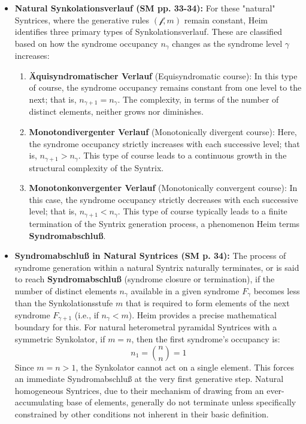 \documentclass[12pt]{article}
\newcommand{\synkolator}{\mathcal{f}}
\newcommand{\synkolationsstufe}{m}
\newcommand{\syndrom}{F} %
\begin{document}
\begin{itemize}
    \item \textbf{Natural Synkolationsverlauf (SM pp. 33-34):}
    For these "natural" Syntrices, where the generative rules \( (\synkolator, \synkolationsstufe) \) remain constant, Heim identifies three primary types of Synkolationsverlauf. These are classified based on how the syndrome occupancy \( n_\gamma \) changes as the syndrome level \( \gamma \) increases:
    \begin{enumerate}
        \item \textbf{Äquisyndromatischer Verlauf} (Equisyndromatic course): In this type of course, the syndrome occupancy remains constant from one level to the next; that is, \( n_{\gamma+1} = n_\gamma \). The complexity, in terms of the number of distinct elements, neither grows nor diminishes.
        \item \textbf{Monotondivergenter Verlauf} (Monotonically divergent course): Here, the syndrome occupancy strictly increases with each successive level; that is, \( n_{\gamma+1} > n_\gamma \). This type of course leads to a continuous growth in the structural complexity of the Syntrix.
        \item \textbf{Monotonkonvergenter Verlauf} (Monotonically convergent course): In this case, the syndrome occupancy strictly decreases with each successive level; that is, \( n_{\gamma+1} < n_\gamma \). This type of course typically leads to a finite termination of the Syntrix generation process, a phenomenon Heim terms \textbf{Syndromabschluß}.
    \end{enumerate}

    \item \textbf{Syndromabschluß in Natural Syntrices (SM p. 34):}
    The process of syndrome generation within a natural Syntrix naturally terminates, or is said to reach \textbf{Syndromabschluß} (syndrome closure or termination), if the number of distinct elements \( n_\gamma \) available in a given syndrome \( \syndrom_\gamma \) becomes less than the Synkolationsstufe \( \synkolationsstufe \) that is required to form elements of the next syndrome \( \syndrom_{\gamma+1} \) (i.e., if \( n_\gamma < \synkolationsstufe \)). Heim provides a precise mathematical boundary for this. For natural heterometral pyramidal Syntrices with a symmetric Synkolator, if $m=n$, then the first syndrome's occupancy is:
    \begin{equation*}
    n_1 = \binom{n}{n} = 1
    \end{equation*}
    Since $m=n > 1$, the Synkolator cannot act on a single element. This forces an immediate Syndromabschluß at the very first generative step. Natural homogeneous Syntrices, due to their mechanism of drawing from an ever-accumulating base of elements, generally do not terminate unless specifically constrained by other conditions not inherent in their basic definition.


\end{itemize}
\end{document}
